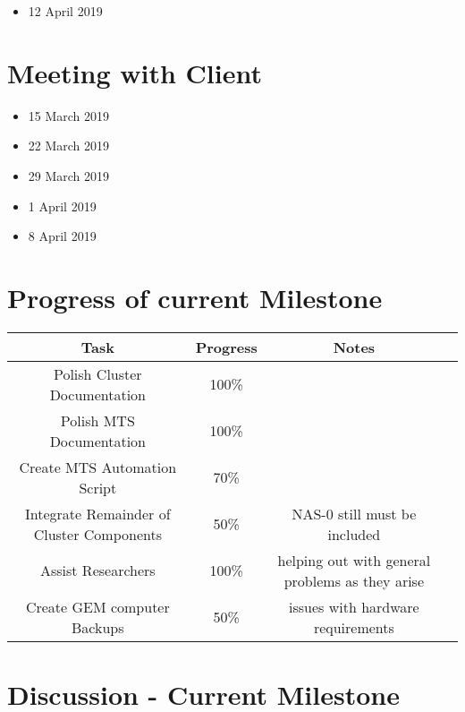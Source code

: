 \documentclass[12pt]{article}
\begin{document}
\begin{itemize}
	\item 12 April 2019
\end{itemize}
\section{Meeting with Client}

\begin{itemize}
	\item 15 March 2019
	\item 22 March 2019
	\item 29 March 2019
	\item 1 April 2019
	\item 8 April 2019
\end{itemize}

\section{Progress of current Milestone}

\begin{adjustwidth}{-2.5cm}{}
  \begin{center}
      \begin{tabular}{|c|c|c|c|}
    	\hline
    	Task & Progress & Notes\\
    	\hline
    	Polish Cluster Documentation & 100\% & \\
    	Polish MTS Documentation & 100\% &  \\
    	Create MTS Automation Script & 70\% &  \\
    	Integrate Remainder of Cluster Components & 50\% & NAS-0 still must be
                                               included \\
    	Assist Researchers & 100\% & helping out with general problems as they
                                     arise \\
        Create GEM computer Backups & 50\% & issues with
        									hardware requirements \\
        
    	\hline
    \end{tabular}
  \end{center}
\end{adjustwidth}



\section{Discussion - Current Milestone} 
\end{document}

